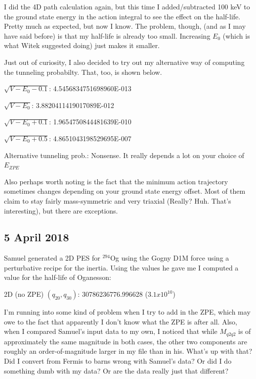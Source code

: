 I did the 4D path calculation again, but this time I added/subtracted 100 keV to the ground state energy in the action integral to see the effect on the half-life. Pretty much as expected, but now I know. The problem, though, (and as I may have said before) is that my half-life is already too small. Increasing $E_0$ (which is what Witek suggested doing) just makes it smaller.

Just out of curiosity, I also decided to try out my alternative way of computing the tunneling probabilty. That, too, is shown below.

\begin{list}{}{Half-lives with different ground state energies:}
\item $\sqrt{V-E_0-0.1}$:    4.5456834751698960E-013
\item $\sqrt{V-E_0}$:    3.8820411419017089E-012
\item $\sqrt{V-E_0+0.1}$:    1.9654750844481639E-010
\item $\sqrt{V-E_0+0.5}$:    4.8651043198529695E-007
\item Alternative tunneling prob.: Nonsense. It really depends a lot on your choice of $E_{ZPE}$
\end{list}

Also perhaps worth noting is the fact that the minimum action trajectory sometimes changes depending on your ground state energy offset. Most of them claim to stay fairly mass-symmetric and very triaxial (Really? Huh. That's interesting), but there are exceptions.

\subsection*{5 April 2018}
Samuel generated a 2D PES for $^{294}$Og using the Gogny D1M force using a perturbative recipe for the inertia. Using the values he gave me I computed a value for the half-life of Oganesson:

\begin{list}{}{Half-life in 2 dimensions from Gogny:}
\item 2D (no ZPE) $(q_{20},q_{30})$:        30786236776.996628 ($3.1x10^10$)
\end{list}

I'm running into some kind of problem when I try to add in the ZPE, which may owe to the fact that apparently I don't know what the ZPE is after all. Also, when I compared Samuel's input data to my own, I noticed that while $M_{q2q2}$ is of approximately the same magnitude in both cases, the other two components are roughly an order-of-magnitude larger in my file than in his. What's up with that? Did I convert from Fermis to barns wrong with Samuel's data? Or did I do something dumb with my data? Or are the data really just that different?

